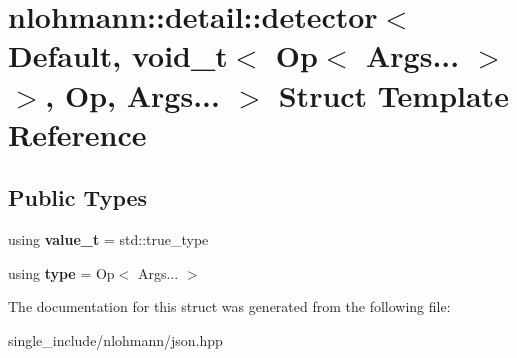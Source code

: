 \hypertarget{structnlohmann_1_1detail_1_1detector_3_01Default_00_01void__t_3_01Op_3_01Args_8_8_8_01_4_01_4_00_01Op_00_01Args_8_8_8_01_4}{}\section{nlohmann\+:\+:detail\+:\+:detector$<$ Default, void\+\_\+t$<$ Op$<$ Args... $>$ $>$, Op, Args... $>$ Struct Template Reference}
\label{structnlohmann_1_1detail_1_1detector_3_01Default_00_01void__t_3_01Op_3_01Args_8_8_8_01_4_01_4_00_01Op_00_01Args_8_8_8_01_4}
\subsection*{Public Types}
\begin{DoxyCompactItemize}
\item 
\mbox{\label{structnlohmann_1_1detail_1_1detector_3_01Default_00_01void__t_3_01Op_3_01Args_8_8_8_01_4_01_4_00_01Op_00_01Args_8_8_8_01_4_ab748f9f00bb31bee4978a033589f8c85}} 
using {\bfseries value\+\_\+t} = std\+::true\+\_\+type
\item 
\mbox{\label{structnlohmann_1_1detail_1_1detector_3_01Default_00_01void__t_3_01Op_3_01Args_8_8_8_01_4_01_4_00_01Op_00_01Args_8_8_8_01_4_a5afd6a40e94dde21d120ac646468c495}} 
using {\bfseries type} = Op$<$ Args... $>$
\end{DoxyCompactItemize}


The documentation for this struct was generated from the following file\+:\begin{DoxyCompactItemize}
\item 
single\+\_\+include/nlohmann/json.\+hpp\end{DoxyCompactItemize}
